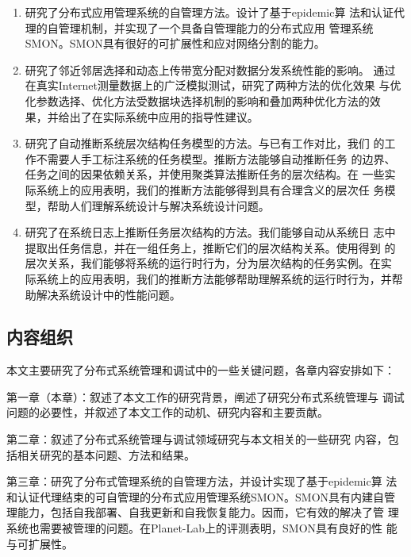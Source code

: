 \begin{enumerate}

  \item 研究了分布式应用管理系统的自管理方法。设计了基于epidemic算
  法和认证代理的自管理机制，并实现了一个具备自管理能力的分布式应用
  管理系统SMON。SMON具有很好的可扩展性和应对网络分割的能力。

  \item 研究了邻近邻居选择和动态上传带宽分配对数据分发系统性能的影响。
  通过在真实Internet测量数据上的广泛模拟测试，研究了两种方法的优化效果
  与优化参数选择、优化方法受数据块选择机制的影响和叠加两种优化方法的效
  果，并给出了在实际系统中应用的指导性建议。

  \item 研究了自动推断系统层次结构任务模型的方法。与已有工作对比，我们
  的工作不需要人手工标注系统的任务模型。推断方法能够自动推断任务
  的边界、任务之间的因果依赖关系，并使用聚类算法推断任务的层次结构。在
  一些实际系统上的应用表明，我们的推断方法能够得到具有合理含义的层次任
  务模型，帮助人们理解系统设计与解决系统设计问题。

  \item 研究了在系统日志上推断任务层次结构的方法。我们能够自动从系统日
  志中提取出任务信息，并在一组任务上，推断它们的层次结构关系。使用得到
  的层次关系，我们能够将系统的运行时行为，分为层次结构的任务实例。在实
  际系统上的应用表明，我们的推断方法能够帮助理解系统的运行时行为，并帮
  助解决系统设计中的性能问题。

\end{enumerate}

\subsection{内容组织}

本文主要研究了分布式系统管理和调试中的一些关键问题，各章内容安排如下：


  第一章（本章）：叙述了本文工作的研究背景，阐述了研究分布式系统管理与
  调试问题的必要性，并叙述了本文工作的动机、研究内容和主要贡献。

  第二章：叙述了分布式系统管理与调试领域研究与本文相关的一些研究
  内容，包括相关研究的基本问题、方法和结果。

  第三章：研究了分布式管理系统的自管理方法，并设计实现了基于epidemic算
  法和认证代理结束的可自管理的分布式应用管理系统SMON。SMON具有内建自管
  理能力，包括自我部署、自我更新和自我恢复能力。因而，它有效的解决了管
  理系统也需要被管理的问题。在Planet-Lab上的评测表明，SMON具有良好的性
  能与可扩展性。

